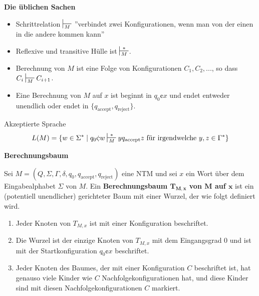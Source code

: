 \documentclass[a4paper, 11pt]{article}
\begin{document}
            \textbf{Die üblichen Sachen}
            \begin{itemize}[label=-]
                \item Schrittrelation $\sststile{M}{}$ ''verbindet zwei Konfigurationen, wenn man von der einen in die andere kommen kann''
                \item Reflexive und transitive Hülle ist $\sststile{M}{*}$.
                \item Berechnung von $M$ ist eine Folge von Konfigurationen $C_1, C_2, ...$, so dass $C_i \sststile{M}{} C_{i+1}$.
                \item Eine Berechnung von $M$ auf $x$ ist beginnt in $q_0\cent x$ und endet entweder unendlich oder endet in $\{q_{\text{accept}}, q_{\text{reject}}\}$.
            \end{itemize}
            \begin{mainbox}{Akzeptierte Sprache}
                $$L(M) = \{w \in \Sigma^* \mid q_0\cent w \sststile{M}{*} yq_{\text{accept}}z \text{ für irgendwelche }y,z \in \Gamma^*\}$$
            \end{mainbox}
        
        
        
            \textbf{Berechnungsbaum}
            \begin{mainbox}{}
                Sei $M=  (Q, \Sigma, \Gamma, \delta, q_0, q_{\text{accept}}, q_{\text{reject}})$ eine NTM 
                und sei $x$ ein Wort über dem Eingabealphabet $\Sigma$ von $M$. 
                Ein \textbf{Berechnungsbaum $\mathbf{T_{M, x}}$ von $\mathbf{M}$ auf $\mathbf{x}$} ist ein 
                (potentiell unendlicher) gerichteter Baum mit einer Wurzel, der wie folgt definiert wird.
        
                \begin{enumerate}[label=(\roman*)]
                    \item Jeder Knoten von $T_{M,x}$ ist mit einer Konfiguration beschriftet.
                    \item Die Wurzel ist der einzige Knoten von $T_{M,x}$ mit dem Eingangsgrad $0$ und ist mit der Startkonfiguration $q_0\cent x$ beschriftet.
                    \item Jeder Knoten des Baumes, der mit einer Konfiguration $C$ beschriftet ist, hat genauso viele Kinder wie $C$ Nachfolgekonfigurationen hat, und diese Kinder sind mit diesen Nachfolgekonfigurationen $C$ markiert.
                \end{enumerate}
            \end{mainbox}
        
\end{document}
